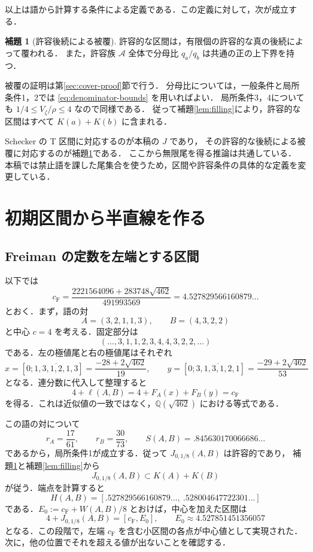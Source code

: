 \documentclass[11pt,a4paper]{article}
\theoremstyle{definition}
\newtheorem{lemma}{補題}
\newcommand{\CF}{c_{\mathrm F}}
\newcommand{\A}{\mathcal A}
\begin{document}
以上は語から計算する条件による定義である．この定義に対して，次が成立する．
\begin{lemma}[許容後続による被覆]\label{lem:cover}
許容的な区間は，有限個の許容的な真の後続によって覆われる．
また，許容族 $\A$ 全体で分母比 $q_a/q_b$ は共通の正の上下界を持つ．
\end{lemma}
被覆の証明は第\ref{sec:cover-proof}節で行う．
分母比については，一般条件と局所条件1，2では \eqref{eq:denominator-bounds} を用いればよい．
局所条件3，4についても $1/4\le V_\zeta/\rho\le4$ なので同様である．
従って補題\ref{lem:filling}により，許容的な区間はすべて $K(a)+K(b)$ に含まれる．

Schecker の T 区間に対応するのが本稿の $J$ であり，
その許容的な後続による被覆に対応するのが補題\ref{lem:cover}である．
ここから無限尾を得る推論は共通している．
本稿では禁止語を課した尾集合を使うため，区間や許容条件の具体的な定義を変更している．

\section{初期区間から半直線を作る}\label{sec:ray}

\subsection{Freiman の定数を左端とする区間}
以下では
\[
 \CF=\frac{2221564096+283748\sqrt{462}}{491993569}
       =4.527829566160879\ldots
\]
とおく．まず，語の対
\[
 A=(3,2,1,1,3),\qquad B=(4,3,2,2)
\]
と中心 $c=4$ を考える．固定部分は
\[
 (\ldots,3,1,1,2,3,\boxed4,4,3,2,2,\ldots)
\]
である．左の極値尾と右の極値尾はそれぞれ
\[
 x=[0;\overline{1,3,1,2,1,3}]=\frac{-28+2\sqrt{462}}{19},\qquad
 y=[0;\overline{3,1,3,1,2,1}]=\frac{-29+2\sqrt{462}}{53}
\]
となる．連分数に代入して整理すると
\begin{equation}\label{eq:CF-endpoint}
 4+\ell(A,B)=4+F_A(x)+F_B(y)=\CF
\end{equation}
を得る．これは近似値の一致ではなく，$\mathbb Q(\sqrt{462})$ における等式である．

この語の対について
\[
 r_A=\frac{17}{61},\qquad r_B=\frac{30}{73},\qquad
 S(A,B)=.845630170066686\ldots
\]
であるから，局所条件1が成立する．従って $J_{0,1/8}(A,B)$ は許容的であり，
補題\ref{lem:cover}と補題\ref{lem:filling}から
\[
 J_{0,1/8}(A,B)\subset K(A)+K(B)
\]
が従う．端点を計算すると
\[
 H(A,B)=[.527829566160879\ldots,\ .528004647722301\ldots]
\]
である．$E_0:=\CF+W(A,B)/8$ とおけば，中心を加えた区間は
\begin{equation}\label{eq:first-interval}
 4+J_{0,1/8}(A,B)
   =[\CF,E_0],\qquad E_0\approx4.527851451356057
\end{equation}
となる．この段階で，左端 $\CF$ を含む小区間の各点が中心値として実現された．
次に，他の位置でそれを超える値が出ないことを確認する．
\end{document}
